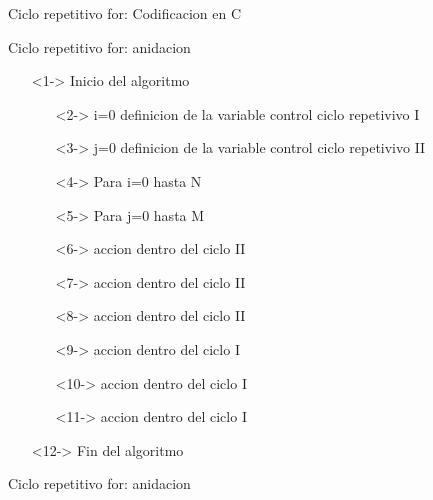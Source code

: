 \documentclass[xcolor=pdftex,table,11pt]{beamer}
\begin{document}
\begin{frame}{Ciclo repetitivo for: Codificacion en C}
\codesetstylefrombeamer
{}
\end{frame}


\begin{frame}{Ciclo repetitivo for: anidacion}
\begin{itemize}
   \item[]<1-> Inicio del algoritmo

   \begin{itemize}
   		\item[]<2-> i=0 definicion de la variable control ciclo repetivivo I
   		\item[]<3-> j=0 definicion de la variable control ciclo repetivivo II
     	\item[]<4-> Para i=0 hasta N
     		\item[]<5-> \hspace{0.3in} Para j=0 hasta M
     		\item[]<6->  \hspace{0.5in} accion dentro del ciclo II
         	\item[]<7->  \hspace{0.5in} accion dentro del ciclo II
			\item[]<8->  \hspace{0.5in} accion dentro del ciclo II
   
   \item[]<9->  \hspace{0.3in}  accion dentro del ciclo I
   \item[]<10->  \hspace{0.3in}  accion dentro del ciclo I
   \item[]<11->  \hspace{0.3in}  accion dentro del ciclo I
   \end{itemize}
  \item[]<12-> Fin del algoritmo\end{itemize}
\end{frame}


\begin{frame}{Ciclo repetitivo for: anidacion}
\codesetstylefrombeamer
{}
\end{frame}
\end{document}

